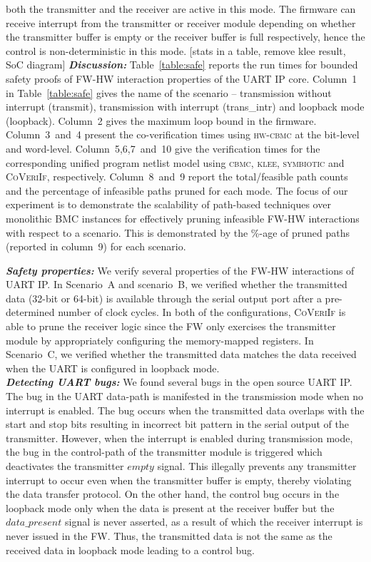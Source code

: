 \documentclass[sigconf]{acmart}
\newcommand{\rmcmt}[1]{{\color{magenta} [{#1}]}}
\newcommand{\tool}[1]{\textsc{#1}\xspace}
\newcommand{\cbmcv}{\tool{cbmc}}
\newcommand{\hwcbmcv}{\tool{hw-cbmc}}
\newcommand{\verifox}{\tool{CoVeriIf}}
\newcommand{\klee}{\tool{klee}}
\begin{document}
both the transmitter and the receiver are active in this mode.  The firmware
can receive interrupt from the transmitter or receiver module depending on
whether the transmitter buffer is empty or the receiver buffer is full
respectively, hence the control is non-deterministic in this mode.
%
\rmcmt{stats in a table, remove klee result, SoC diagram}
\textbf{\emph{Discussion:}}
Table~\ref{table:safe} reports the run times for bounded safety proofs of
FW-HW interaction properties of the UART IP core.  Column~1 in
Table~\ref{table:safe} gives the name of the scenario -- transmission
without interrupt (transmit), transmission with interrupt (trans\_intr) and
loopback mode (loopback).  Column~2 gives the maximum loop bound in the
firmware.  Column~3~and~4 present the co-verification times using \hwcbmcv
at the bit-level and word-level.  Column~5,6,7~and~10 give the verification
times for the corresponding unified program netlist model using \cbmcv,
\klee, \textsc{symbiotic} and \verifox, respectively.  Column~8~and~9 report
the total/feasible path counts and the percentage of infeasible paths pruned
for each mode.  The focus of our experiment is to demonstrate the
scalability of path-based techniques over monolithic BMC instances for
effectively pruning infeasible FW-HW interactions with respect to a
scenario.  This is demonstrated by the \%-age of pruned paths (reported in
column~9) for each scenario.

\textbf{\emph{Safety properties:}}
We verify several properties of the FW-HW interactions of UART IP. 
In Scenario~A and scenario~B, we verified whether
the transmitted data (32-bit or 64-bit) is available through the serial
output port after a pre-determined number of clock cycles.
In both of the
configurations, \verifox is able to prune the receiver logic since the
FW only exercises the transmitter module by appropriately configuring
the memory-mapped registers.  In Scenario~C, we verified whether the transmitted
data matches the data received when the UART is configured in loopback
mode.\\ 
\textbf{\emph{Detecting UART bugs:}}
We found several bugs in the open source UART IP. 
The bug in the UART data-path is manifested in the transmission mode when no
interrupt is enabled.  The bug occurs when the transmitted data overlaps
with the start and stop bits resulting in incorrect bit pattern in the
serial output of the transmitter.  However, when the interrupt is enabled
during transmission mode, the bug in the control-path of the transmitter
module is triggered which deactivates the transmitter $empty$ signal.  This
illegally prevents any transmitter interrupt to occur even when the
transmitter buffer is empty, thereby violating the data transfer protocol. 
On the other hand, the control bug occurs in the loopback mode only when the
data is present at the receiver buffer but the $data\_present$ signal is
never asserted, as a result of which the receiver interrupt is never issued
in the FW. Thus, the transmitted data is not the same as the received
data in loopback mode leading to a control bug.
\end{document}
